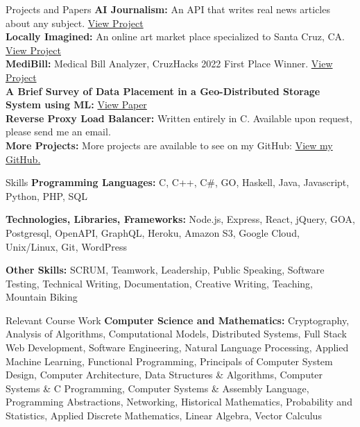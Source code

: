 \documentclass{resume} %
\begin{document}
\begin{rSection}{Projects and Papers}
    {\bf{AI Journalism:}} An API that writes real news articles about any subject. \href{https://github.com/azsteinb/AIJournalism}{View Project}
    \\{\bf{Locally Imagined:}} An online art market place specialized to Santa Cruz, CA. \href{https://locallyimagined.com/}{View Project}
    \\{\bf{MediBill:}} Medical Bill Analyzer, CruzHacks 2022 First Place Winner. \href{https://devpost.com/software/health-hacker-7soucr}{View Project}
    \\{\bf{A Brief Survey of Data Placement in a Geo-Distributed Storage System using ML}: } \href{https://docs.google.com/document/u/1/d/e/2PACX-1vRi_JSl3urSJMr-Mj7rZGkyrPzMANauaqdgXekPwFfHyUSlrkR0azLyoCxT_S0u2tvndypQ5d6vsJwy/pub}{View Paper}
    \\{\bf{Reverse Proxy Load Balancer:} } Written entirely in C. Available upon request, please send me an email.
    \\{\bf{More Projects:} } More projects are available to see on my GitHub: \href{https://github.com/azsteinb}{View my GitHub.}
\end{rSection}

\begin{rSection}{Skills}
    {\bf{Programming Languages:} } C, C++, C\#, GO, Haskell, Java, Javascript, Python, PHP, SQL

    {\bf{Technologies, Libraries, Frameworks:} } Node.js, Express, React, jQuery, GOA, Postgresql, OpenAPI, GraphQL, Heroku, Amazon S3, Google Cloud, Unix/Linux, Git, WordPress

    {\bf{Other Skills:} } SCRUM, Teamwork, Leadership, Public Speaking, Software Testing, Technical Writing, Documentation, Creative Writing, Teaching, Mountain Biking
\end{rSection}

\begin{rSection}{Relevant Course Work}
    {\bf{Computer Science and Mathematics:} } Cryptography, Analysis of Algorithms, Computational Models, Distributed Systems, Full Stack Web Development,
    Software Engineering, Natural Language Processing, Applied Machine Learning, Functional Programming, Principals of Computer System Design, Computer Architecture, Data Structures \& Algorithms,
    Computer Systems \& C Programming, Computer Systems \& Assembly Language, Programming Abstractions, Networking, Historical Mathematics, Probability and Statistics, Applied Discrete Mathematics, Linear Algebra, Vector Calculus
\end{rSection}
    
\end{document}

